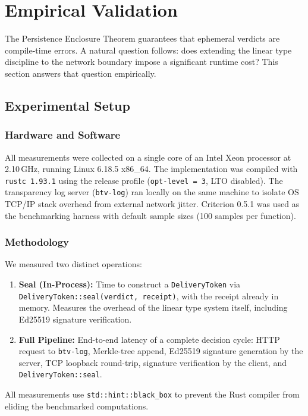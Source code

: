 \section{Empirical Validation}
\label{sec:benchmarks}

The Persistence Enclosure Theorem guarantees that ephemeral verdicts are
compile-time errors. A natural question follows: does extending the linear
type discipline to the network boundary impose a significant runtime cost?
This section answers that question empirically.

\subsection{Experimental Setup}

\subsubsection{Hardware and Software}
All measurements were collected on a single core of an Intel Xeon processor
at 2.10\,GHz, running Linux 6.18.5 x86\_64. The implementation was compiled
with \texttt{rustc 1.93.1} using the release profile (\texttt{opt-level~=~3},
LTO disabled). The transparency log server (\texttt{btv-log}) ran locally on
the same machine to isolate OS TCP/IP stack overhead from external network
jitter. Criterion 0.5.1 was used as the benchmarking harness with default
sample sizes (100 samples per function).

\subsubsection{Methodology}
We measured two distinct operations:
\begin{enumerate}
  \item \textbf{Seal (In-Process):} Time to construct a \texttt{DeliveryToken}
  via \texttt{DeliveryToken::seal(verdict,~receipt)}, with the receipt already
  in memory. Measures the overhead of the linear type system itself, including
  Ed25519 signature verification.
  \item \textbf{Full Pipeline:} End-to-end latency of a complete decision cycle:
  HTTP request to \texttt{btv-log}, Merkle-tree append, Ed25519 signature
  generation by the server, TCP loopback round-trip, signature verification
  by the client, and \texttt{DeliveryToken::seal}.
\end{enumerate}

\noindent All measurements use \texttt{std::hint::black\_box} to prevent the
Rust compiler from eliding the benchmarked computations.

